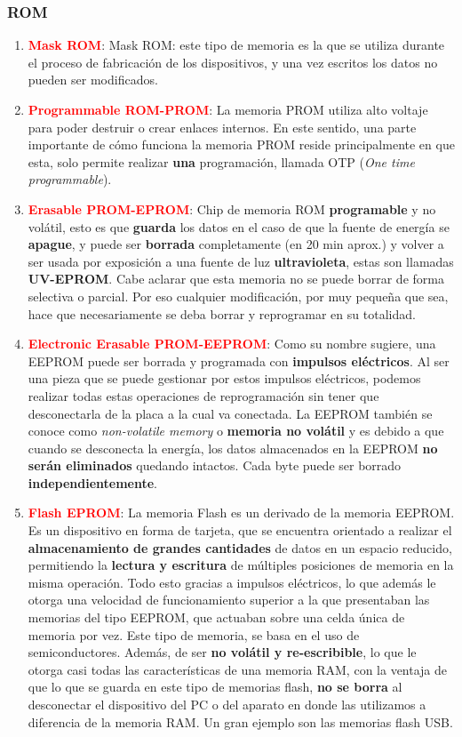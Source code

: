 \documentclass[
	12pt, %
	fleqn, %
	a4paper, %
]{LegrandOrangeBook}
\begin{document}
\subsubsection{ROM}
\begin{enumerate}
\item \textbf{\textcolor{red}{Mask ROM}}: Mask ROM: este tipo de memoria es la que se utiliza durante el proceso de fabricación de los dispositivos, y una vez escritos los datos no pueden ser modificados.
\item \textbf{\textcolor{red}{Programmable ROM-PROM}}: La memoria PROM utiliza alto voltaje para poder destruir o crear enlaces internos. En este sentido, una parte importante de cómo funciona la memoria PROM reside principalmente en que esta, solo permite realizar \textbf{una} programación, llamada OTP (\textit{One time programmable}).
\item \textbf{\textcolor{red}{Erasable PROM-EPROM}}: Chip de memoria ROM \textbf{programable} y no volátil, esto es que \textbf{guarda} los datos en el caso de que la fuente de energía se \textbf{apague}, y puede ser \textbf{borrada} completamente (en 20 min aprox.) y volver a ser usada por exposición a una fuente de luz \textbf{ultravioleta}, estas son llamadas \textbf{UV-EPROM}. Cabe aclarar que esta memoria no se puede borrar de forma selectiva o parcial. Por eso cualquier modificación, por muy pequeña que sea, hace que necesariamente se deba borrar y reprogramar en su totalidad.
\item \textbf{\textcolor{red}{Electronic Erasable PROM-EEPROM}}:  Como su nombre sugiere, una EEPROM puede ser borrada y programada con \textbf{impulsos eléctricos}. Al ser una pieza que se puede gestionar por estos impulsos eléctricos, podemos realizar todas estas operaciones de reprogramación sin tener que desconectarla de la placa a la cual va conectada. La EEPROM también se conoce como \textit{non-volatile memory} o \textbf{memoria no volátil} y es debido a que cuando se desconecta la energía, los datos almacenados en la EEPROM \textbf{no serán eliminados} quedando intactos. Cada byte puede ser borrado \textbf{independientemente}.
\item \textbf{\textcolor{red}{Flash EPROM}}: La memoria Flash es un derivado de la memoria EEPROM. Es un dispositivo en forma de tarjeta, que se encuentra orientado a realizar el \textbf{almacenamiento de grandes cantidades} de datos en un espacio reducido, permitiendo la \textbf{lectura y escritura} de múltiples posiciones de memoria en la misma operación. Todo esto gracias a impulsos eléctricos, lo que además le otorga una velocidad de funcionamiento superior a la que presentaban las memorias del tipo EEPROM, que actuaban sobre una celda única de memoria por vez. Este tipo de memoria, se basa en el uso de semiconductores. Además, de ser \textbf{no volátil y re-escribible}, lo que le otorga casi todas las características de una memoria RAM, con la ventaja de que lo que se guarda en este tipo de memorias flash, \textbf{no se borra} al desconectar el dispositivo del PC o del aparato en donde las utilizamos a diferencia de la memoria RAM. Un gran ejemplo son las memorias flash USB.
\end{enumerate}
\end{document}
